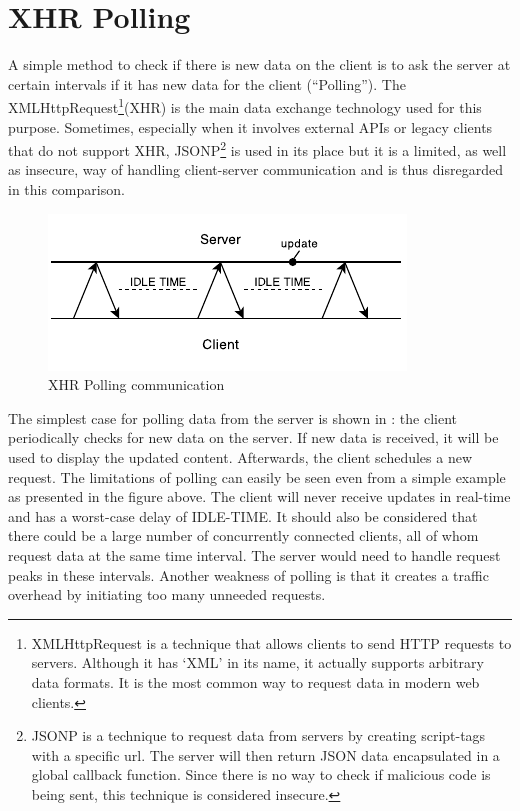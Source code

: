 \section{XHR Polling}

A simple method to check if there is new data on the client is to ask the server at certain intervals if it has new data for the client (``Polling''). The XMLHttpRequest\footnote{XMLHttpRequest is a technique that allows clients to send HTTP requests to servers. Although it has `XML' in its name, it actually supports arbitrary data formats. It is the most common way to request data in modern web clients.}(XHR) is the main data exchange technology used for this purpose. Sometimes, especially when it involves external APIs or legacy clients that do not support XHR, JSONP\footnote{JSONP is a technique to request data from servers by creating script-tags with a specific url. The server will then return JSON data encapsulated in a global callback function. Since there is no way to check if malicious code is being sent, this technique is considered insecure.} is used in its place but it is a limited, as well as insecure, way of handling client-server communication and is thus disregarded in this comparison.

\begin{figure}[htb]
  \centerline{\includegraphics[width=0.8\linewidth]{images/Polling.pdf}}
  \caption[XHR Polling communication]{XHR Polling communication}
  \label{fig:polling}
\end{figure}

The simplest case for polling data from the server is shown in : the client periodically checks for new data on the server. If new data is received, it will be used to display the updated content. Afterwards, the client schedules a new request. The limitations of polling can easily be seen even from a simple example as presented in the figure above. The client will never receive updates in real-time and has a worst-case delay of IDLE-TIME. It should also be considered that there could be a large number of concurrently connected clients, all of whom request data at the same time interval. The server would need to handle request peaks in these intervals. Another weakness of polling is that it creates a traffic overhead by initiating too many unneeded requests.

